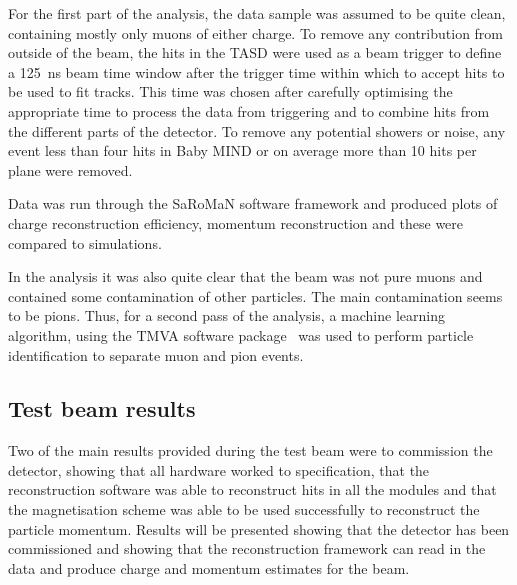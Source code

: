 For the first part of the analysis, the data sample was assumed to be quite clean, containing mostly only muons of either charge. To remove any contribution from outside of the beam, the hits in the TASD were used as a beam trigger to define a 125~ns beam time window after the trigger time within which to accept hits to be used to fit tracks. This time was chosen after carefully optimising the appropriate time to process the data from triggering and to combine hits from the different parts of the detector. To remove any potential showers or noise, any event less than four hits in Baby MIND or on average more than 10 hits per plane were removed.

Data was run through the SaRoMaN software framework and produced plots of charge reconstruction efficiency, momentum reconstruction and these were compared to simulations.

In the analysis it was also quite clear that the beam was not pure muons and contained some contamination of other particles. The main contamination seems to be pions. Thus, for a second pass of the analysis, a machine learning algorithm, using the TMVA software package~\cite{TMVA} was used to perform particle identification to separate muon and pion events.









\subsection{Test beam results}
Two of the main results provided during the test beam were to commission the detector, showing that all hardware worked to specification, that the reconstruction software was able to reconstruct hits in all the modules and that the magnetisation scheme was able to be used successfully to reconstruct the particle momentum. Results will be presented showing that the detector has been commissioned and showing that the reconstruction framework can read in the data and produce charge and momentum estimates for the beam.

